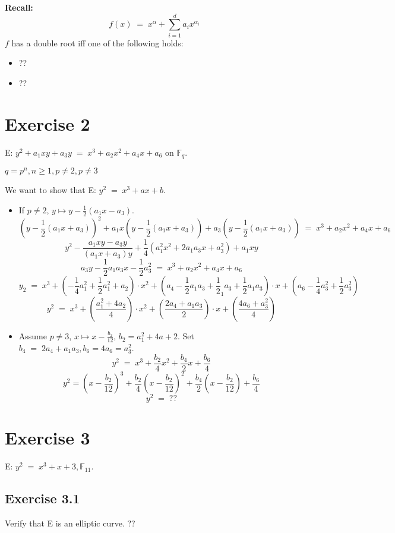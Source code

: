 \documentclass[a4paper]{scrreprt}
\newcommand\F{\mathbb F}
\begin{document}
\smallskip

\textbf{Recall:}
\[f(x) \;=\; x^\alpha + \sum_{i=1}^d a_i x^{\alpha_i}\]
$f$ has a double root iff one of the following holds:
\begin{itemize}
    \item ??
    \item ??
\end{itemize}

\section*{Exercise 2}

E: $y^2 + a_1xy + a_3 y \;=\; x^3 + a_2x^2 + a_4x + a_6$ on $\F_q$.

$q=p^n, n\geq1, p\neq2, p\neq 3$

We want to show that E: $y^2\;=\; x^3 +ax + b$.

\begin{itemize}
    \item If $p\neq2$, $y\mapsto y-\frac 1 2(a_1x-a_3)$.
        \[\left(y-\frac 1 2(a_1x + a_3)\right)^2 + a_1x\left(y-\frac 1 2(a_1x+a_3)\right)
            + a_3\left(y-\frac 1 2(a_1x+a_3)\right) \;=\; x^3+a_2x^2+a_4x+a_6\]
        \[y^2 - \frac{a_1xy-a_3y}{(a_1x+a_3)y} + \frac 1 4(a_1^2x^2 + 2a_1a_3x+ a_3^2)+a_1xy\]
        \[a_3y-\frac 1 2a_1a_3x - \frac 1 2a_3^2 \;=\; x^3+a_2x^2 + a_4x+a_6\]
        \[y_2\;=\;x^3+\left(-\frac1 4a_1^2+\frac1 2a_1^2 + a_2\right)\cdot x^2+\left(a_4-\frac 1 2a_1a_3
            + \frac1 2_1a_3+\frac1 2 a_1a_3\right)\cdot x + \left(a_6-\frac1 4a_3^2+\frac1 2a_3^2\right)\]
        \[y^2 \;=\; x^3+\left(\frac{a_1^2+4a_2}4\right)\cdot x^2 + \left(\frac{2a_4 + a_1a_3}2\right)\cdot x
            + \left(\frac{4a_6 + a_3^2}4\right)\]
    \item Assume $p\neq 3$, $x\mapsto x-\frac{b_2}{12}$, $b_2 = a_1^2+4a+2$. Set
        $b_4 \;=\; 2a_4 + a_1a_3, b_6 = 4a_6 = a_3^2$.
        \[y^2 \;=\; x^3 + \frac {b_2}4x^2 + \frac{b_4}2x+\frac{b_6}4\]
        \[y^2 = \left(x-\frac{b_2}{12}\right)^3 + \frac{b_2}{4}\left(x-\frac{b_2}{12}\right)^2
            + \frac{b_4}2\left(x-\frac{b_2}{12}\right) + \frac{b_6} 4\]
            \[y^2 \;=\; ??\]
\end{itemize}

\section*{Exercise 3}
E: $y^2 \;=\; x^3 + x + 3, \F_11$.
\subsection*{Exercise 3.1}
Verify that E is an elliptic curve.
??
\end{document}
